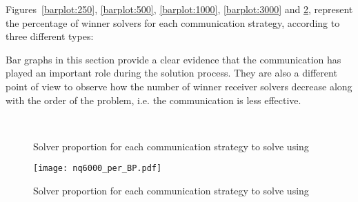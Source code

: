 Figures~\ref{barplot:250}, \ref{barplot:500}, \ref{barplot:1000}, \ref{barplot:3000} and \ref{barplot:6000}, represent the percentage of winner solvers for each communication strategy, according to three different types:


Bar graphs in this section provide a clear evidence that the communication has played an important role during the solution process. They are also a different point of view to observe how the number of winner receiver solvers decrease along with the order of the problem, i.e. the communication is less effective.

\begin{figure}[!h]
\centering
{} %
\\
\caption[]{Solver proportion for each communication strategy to solve \NQP{} using \posl}
\label{fig:bars_nq}
\end{figure}

\begin{figure}[!h]
\centering
\texttt{[image: nq6000\_per\_BP.pdf]}
\caption{Solver proportion for each communication strategy to solve \NQP{} using \posl}\label{barplot:6000}
\end{figure}